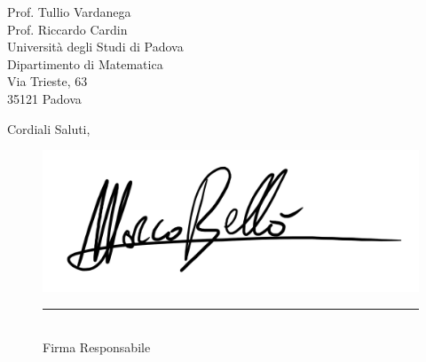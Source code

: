 \documentclass{articoletteracdp}
\begin{document}
\begin{letter}{
			Prof. Tullio Vardanega \\
			Prof. Riccardo Cardin \\
			Università degli Studi di Padova \\
			Dipartimento di Matematica \\
			Via Trieste, 63 \\
			35121 Padova
		}
		\vspace{0.5cm}
		\closing{Cordiali Saluti,}
		\begin{figure}[!h]
			\begin{flushright}
				\includegraphics[width=0.2\linewidth]{sezioni/firma_mb.png}
			\end{flushright}
			\begin{flushright}
				\rule{100pt}{0.1pt}\\
				Firma Responsabile
			\end{flushright}
		\end{figure}
	\end{letter}
\end{document}
